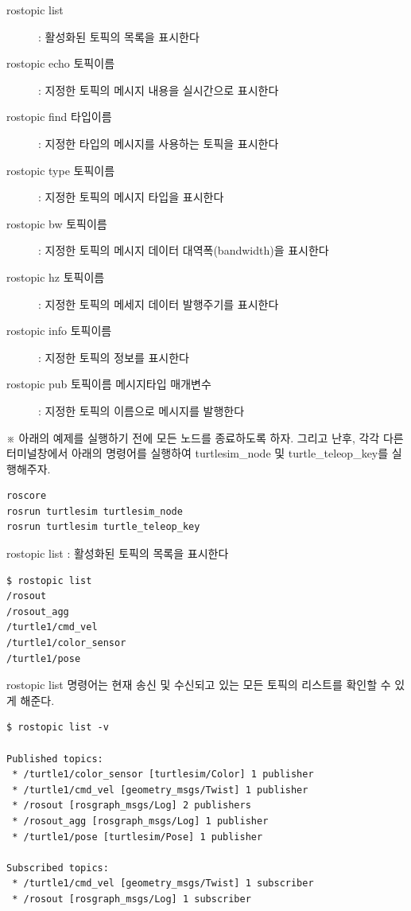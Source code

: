 \vspace{\baselineskip}
\noindent
\begin{description}
\item[rostopic list] : 활성화된 토픽의 목록을 표시한다
\item[rostopic echo 토픽이름] : 지정한 토픽의 메시지 내용을 실시간으로 표시한다
\item[rostopic find 타입이름] : 지정한 타입의 메시지를 사용하는 토픽을 표시한다
\item[rostopic type 토픽이름] : 지정한 토픽의 메시지 타입을 표시한다
\item[rostopic bw 토픽이름] : 지정한 토픽의 메시지 데이터 대역폭(bandwidth)을 표시한다
\item[rostopic hz 토픽이름] : 지정한 토픽의 메세지 데이터 발행주기를 표시한다
\item[rostopic info 토픽이름] : 지정한 토픽의 정보를 표시한다
\item[rostopic pub 토픽이름 메시지타입 매개변수] : 지정한 토픽의 이름으로 메시지를 발행한다
\end{description}

\vspace{\baselineskip}
\noindent
※ 아래의 예제를 실행하기 전에 모든 노드를 종료하도록 하자. 그리고 난후, 각각 다른 터미널창에서 아래의 명령어를 실행하여 turtlesim\_node 및 turtle\_teleop\_key를 실행해주자.

\begin{lstlisting}[language=ROS]
roscore
rosrun turtlesim turtlesim_node 
rosrun turtlesim turtle_teleop_key
\end{lstlisting}

\setcounter{num}{0}

\vspace{\baselineskip}
\noindent
{}\circled{\thenum} rostopic list : 활성화된 토픽의 목록을 표시한다

\begin{lstlisting}[language=ROS]
$ rostopic list
/rosout
/rosout_agg
/turtle1/cmd_vel
/turtle1/color_sensor
/turtle1/pose
\end{lstlisting}

\noindent
rostopic list 명령어는 현재 송신 및 수신되고 있는 모든 토픽의 리스트를 확인할 수 있게 해준다.

\begin{lstlisting}[language=ROS]
$ rostopic list -v

Published topics:
 * /turtle1/color_sensor [turtlesim/Color] 1 publisher
 * /turtle1/cmd_vel [geometry_msgs/Twist] 1 publisher
 * /rosout [rosgraph_msgs/Log] 2 publishers
 * /rosout_agg [rosgraph_msgs/Log] 1 publisher
 * /turtle1/pose [turtlesim/Pose] 1 publisher

Subscribed topics:
 * /turtle1/cmd_vel [geometry_msgs/Twist] 1 subscriber
 * /rosout [rosgraph_msgs/Log] 1 subscriber
\end{lstlisting}

